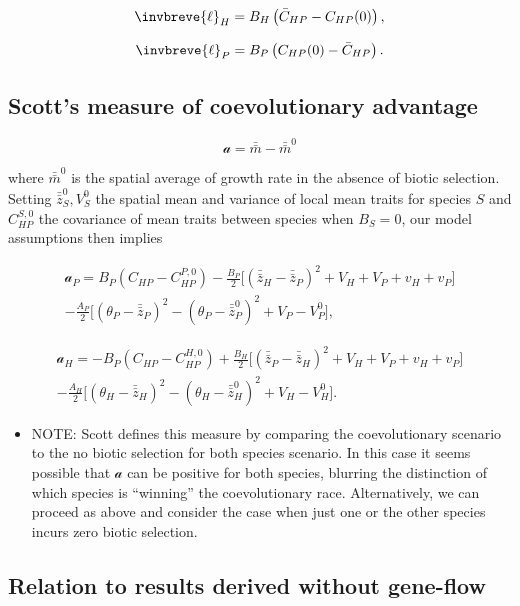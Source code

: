 \documentclass{article}
\begin{document}
\[\invbreve{\ell}_H=B_H\left(\bar C_{HP}-C_{HP}(0)\right),\]

\[\invbreve{\ell}_P=B_P\left(C_{HP}(0)-\bar C_{HP}\right).\]

\hypertarget{scotts-measure-of-coevolutionary-advantage}{%
\subsection{Scott's measure of coevolutionary
advantage}\label{scotts-measure-of-coevolutionary-advantage}}

\[\mathcal a=\bar{\bar m}-\bar{\bar m}^0\]

where \(\bar{\bar m}^0\) is the spatial average of growth rate in the
absence of biotic selection. Setting \(\bar{\bar z}_S^0, V_S^0\) the
spatial mean and variance of local mean traits for species \(S\) and
\(C_{HP}^{S,0}\) the covariance of mean traits between species when
\(B_S=0\), our model assumptions then implies

\begin{multline}
  \mathcal a_P=B_P(C_{HP}-C_{HP}^{P,0})-\frac{B_P}{2}\big[(\bar{\bar z}_H-\bar{\bar z}_P)^2+V_H+V_P+v_H+v_P\big] \\
  -\frac{A_P}{2}\big[(\theta_P-\bar{\bar z}_P)^2-(\theta_P-\bar{\bar z}_P^0)^2+V_P-V_P^0\big],
\end{multline}

\begin{multline}
  \mathcal a_H=-B_P(C_{HP}-C_{HP}^{H,0})+\frac{B_H}{2}\big[(\bar{\bar z}_P-\bar{\bar z}_H)^2+V_H+V_P+v_H+v_P\big] \\
  -\frac{A_H}{2}\big[(\theta_H-\bar{\bar z}_H)^2-(\theta_H-\bar{\bar z}_H^0)^2+V_H-V_H^0\big].
\end{multline}

\begin{itemize}
\tightlist
\item
  NOTE: Scott defines this measure by comparing the coevolutionary
  scenario to the no biotic selection for both species scenario. In this
  case it seems possible that \(\mathcal a\) can be positive for both
  species, blurring the distinction of which species is ``winning'' the
  coevolutionary race. Alternatively, we can proceed as above and
  consider the case when just one or the other species incurs zero
  biotic selection.
\end{itemize}

\hypertarget{relation-to-results-derived-without-gene-flow}{%
\subsection{Relation to results derived without
gene-flow}\label{relation-to-results-derived-without-gene-flow}}
\end{document}
